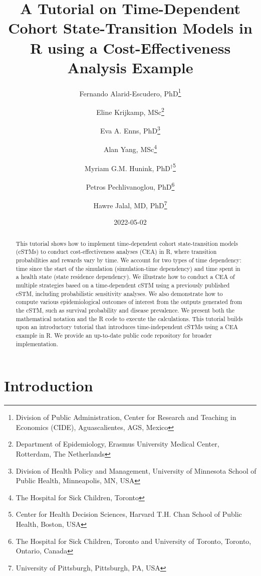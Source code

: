 \documentclass[
]{article}
\title{A Tutorial on Time-Dependent Cohort State-Transition Models in R using a Cost-Effectiveness Analysis Example}
\author{Fernando Alarid-Escudero, PhD\footnote{Division of Public Administration, Center for Research and Teaching in Economics (CIDE), Aguascalientes, AGS, Mexico} \and Eline Krijkamp, MSc\footnote{Department of Epidemiology, Erasmus University Medical Center, Rotterdam, The Netherlands} \and Eva A. Enns, PhD\footnote{Division of Health Policy and Management, University of Minnesota School of Public Health, Minneapolis, MN, USA} \and Alan Yang, MSc\footnote{The Hospital for Sick Children, Toronto} \and Myriam G.M. Hunink, PhD\(^\dagger\)\footnote{Center for Health Decision Sciences, Harvard T.H. Chan School of Public Health, Boston, USA} \and Petros Pechlivanoglou, PhD\footnote{The Hospital for Sick Children, Toronto and University of Toronto, Toronto, Ontario, Canada} \and Hawre Jalal, MD, PhD\footnote{University of Pittsburgh, Pittsburgh, PA, USA}}
\date{2022-05-02}
\begin{document}
\maketitle
\begin{abstract}
This tutorial shows how to implement time-dependent cohort state-transition models (cSTMs) to conduct cost-effectiveness analyses (CEA) in R, where transition probabilities and rewards vary by time. We account for two types of time dependency: time since the start of the simulation (simulation-time dependency) and time spent in a health state (state residence dependency). We illustrate how to conduct a CEA of multiple strategies based on a time-dependent cSTM using a previously published cSTM, including probabilistic sensitivity analyses. We also demonstrate how to compute various epidemiological outcomes of interest from the outputs generated from the cSTM, such as survival probability and disease prevalence. We present both the mathematical notation and the R code to execute the calculations. This tutorial builds upon an introductory tutorial that introduces time-independent cSTMs using a CEA example in R. We provide an up-to-date public code repository for broader implementation.
\end{abstract}

{
\setcounter{tocdepth}{2}
\tableofcontents
}
\hypertarget{introduction}{%
\section{Introduction}\label{introduction}}
\end{document}
